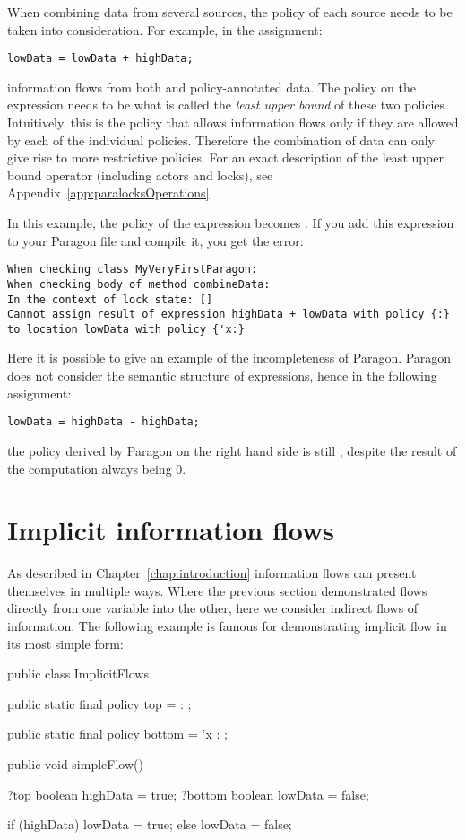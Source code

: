 When combining data from several sources, the policy of each source needs to be
taken into consideration. For example, in the assignment:
\begin{lstlisting}
lowData = lowData + highData;
\end{lstlisting}
information flows from both  and  policy-annotated data. 
The policy on the expression needs to be what is called the 
\emph{least upper bound} of these two policies. Intuitively, this is the policy
that allows information flows only if they are allowed by each of the individual
policies. Therefore the combination of data can only give rise to more restrictive
policies. For an exact description of the least upper bound operator (including 
actors and locks), see Appendix~\ref{app:paralocksOperations}.

In this example, the policy of the expression  becomes
. If you add this expression to your Paragon file and compile it, you
get the error:

\begin{lstlisting}
When checking class MyVeryFirstParagon:
When checking body of method combineData:
In the context of lock state: []
Cannot assign result of expression highData + lowData with policy {:} to location lowData with policy {'x:}
\end{lstlisting}

Here it is possible to give an example of the incompleteness of Paragon. Paragon
does not consider the semantic structure of expressions, hence in the following
assignment:
\begin{lstlisting}
lowData = highData - highData;
\end{lstlisting}
the policy derived by Paragon on the right hand side is still , despite
the result of the computation always being 0.

\section{Implicit information flows}

As described in Chapter~\ref{chap:introduction} information flows can present
themselves in multiple ways. Where the previous section demonstrated flows 
directly from one variable into the other, here we consider indirect flows of
information. The following example is famous for demonstrating implicit flow
in its most simple form:

\begin{paragoncode}
public class ImplicitFlows {

  public static final policy top = { : } ;
  
  public static final policy bottom = { 'x : } ;

  public void simpleFlow() {
  
    ?top boolean highData = true;
    ?bottom boolean lowData = false;
    
    if (highData) {
      lowData = true;
    } else {
      lowData = false;
    }
    
  }
}
\end{paragoncode}

